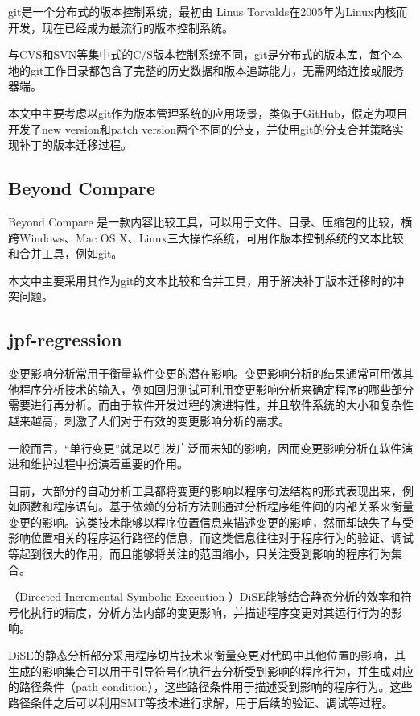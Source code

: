 git是一个分布式的版本控制系统，最初由 Linus Torvalds在2005年为Linux内核而开发，现在已经成为最流行的版本控制系统。

与CVS和SVN等集中式的C/S版本控制系统不同，git是分布式的版本库，每个本地的git工作目录都包含了完整的历史数据和版本追踪能力，无需网络连接或服务器端。
      

本文中主要考虑以git作为版本管理系统的应用场景，类似于GitHub，假定为项目开发了new version和patch version两个不同的分支，并使用git的分支合并策略实现补丁的版本迁移过程。
	\subsection{Beyond Compare}
		
Beyond Compare 是一款内容比较工具，可以用于文件、目录、压缩包的比较，横跨Windows、Mac OS X、Linux三大操作系统，可用作版本控制系统的文本比较和合并工具，例如git。
      
本文中主要采用其作为git的文本比较和合并工具，用于解决补丁版本迁移时的冲突问题。


	\subsection{jpf-regression} 
变更影响分析常用于衡量软件变更的潜在影响。变更影响分析的结果通常可用做其他程序分析技术的输入，例如回归测试可利用变更影响分析来确定程序的哪些部分需要进行再分析。而由于软件开发过程的演进特性，并且软件系统的大小和复杂性越来越高，刺激了人们对于有效的变更影响分析的需求。\cite{rungta2012change}

一般而言，“单行变更”就足以引发广泛而未知的影响，因而变更影响分析在软件演进和维护过程中扮演着重要的作用。

目前，大部分的自动分析工具都将变更的影响以程序句法结构的形式表现出来，例如函数和程序语句。基于依赖的分析方法则通过分析程序组件间的内部关系来衡量变更的影响。这类技术能够以程序位置信息来描述变更的影响，然而却缺失了与受影响位置相关的程序运行路径的信息，而这类信息往往对于程序行为的验证、调试等起到很大的作用，而且能够将关注的范围缩小，只关注受到影响的程序行为集合。

（Directed Incremental Symbolic Execution ）DiSE\cite{person2011directed,yang2014directed}能够结合静态分析的效率和符号化执行的精度，分析方法内部的变更影响，并描述程序变更对其运行行为的影响。

DiSE的静态分析部分采用程序切片技术来衡量变更对代码中其他位置的影响，其生成的影响集合可以用于引导符号化执行去分析受到影响的程序行为，并生成对应的路径条件（path condition），这些路径条件用于描述受到影响的程序行为。这些路径条件之后可以利用SMT等技术进行求解，用于后续的验证、调试等过程。

